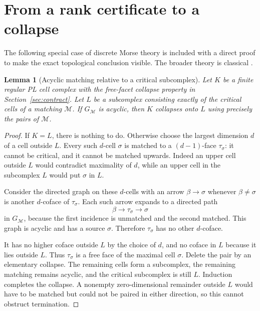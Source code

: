 \documentclass[11pt,letterpaper]{article}
\newtheorem{lemma}[theorem]{Lemma}
\theoremstyle{definition}
\theoremstyle{remark}\newtheorem{remark}[theorem]{Remark}
\begin{document}
\section{From a rank certificate to a collapse}
\label{sec:topology}

The following special case of discrete Morse theory is included with a direct proof to make the exact topological conclusion visible. The broader theory is classical \cite{forman,whitehead,abl}.

\begin{lemma}[Acyclic matching relative to a critical subcomplex]
\label{lem:collapse}
Let $K$ be a finite regular PL cell complex with the free-facet collapse property in Section~\ref{sec:contract}. Let $L$ be a subcomplex consisting exactly of the critical cells of a matching $\mathcal M$. If $G_{\mathcal M}$ is acyclic, then $K$ collapses onto $L$ using precisely the pairs of $\mathcal M$.
\end{lemma}
\begin{proof}
If $K=L$, there is nothing to do. Otherwise choose the largest dimension $d$ of a cell outside $L$. Every such $d$-cell $\sigma$ is matched to a $(d-1)$-face $\tau_\sigma$: it cannot be critical, and it cannot be matched upwards. Indeed an upper cell outside $L$ would contradict maximality of $d$, while an upper cell in the subcomplex $L$ would put $\sigma$ in $L$.

Consider the directed graph on these $d$-cells with an arrow $\beta\to\sigma$ whenever $\beta\neq\sigma$ is another $d$-coface of $\tau_\sigma$. Each such arrow expands to a directed path
\[
          \beta\longrightarrow\tau_\sigma\longrightarrow\sigma
\]
in $G_{\mathcal M}$, because the first incidence is unmatched and the second matched. This graph is acyclic and has a source $\sigma$. Therefore $\tau_\sigma$ has no other $d$-coface.

It has no higher coface outside $L$ by the choice of $d$, and no coface in $L$ because it lies outside $L$. Thus $\tau_\sigma$ is a free face of the maximal cell $\sigma$. Delete the pair by an elementary collapse. The remaining cells form a subcomplex, the remaining matching remains acyclic, and the critical subcomplex is still $L$. Induction completes the collapse. A nonempty zero-dimensional remainder outside $L$ would have to be matched but could not be paired in either direction, so this cannot obstruct termination.
\end{proof}
\end{document}
